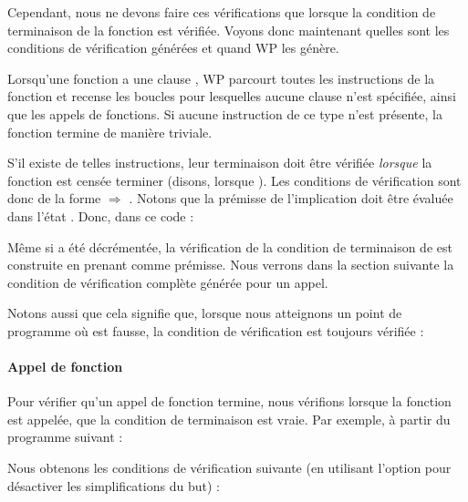 Cependant, nous ne devons faire ces vérifications que lorsque la condition de
terminaison de la fonction est vérifiée. Voyons donc maintenant quelles sont les
conditions de vérification générées et quand WP les génère.


Lorsqu'une fonction a une clause , WP parcourt toutes les
instructions de la fonction et recense les boucles pour lesquelles aucune
clause  n'est spécifiée, ainsi que les appels de
fonctions. Si aucune instruction de ce type n'est présente, la fonction termine
de manière triviale.




S'il existe de telles instructions, leur terminaison doit être vérifiée
\textit{lorsque} la fonction est censée terminer (disons, lorsque ).
Les conditions de vérification sont donc de la forme
 $\Rightarrow$ .
Notons que la prémisse de l'implication doit être évaluée dans l'état
. Donc, dans ce code :




Même si  a été décrémentée, la vérification de la condition de
terminaison de  est construite en prenant
 comme prémisse. Nous verrons dans
la section suivante la condition de vérification complète générée pour un appel.


Notons aussi que cela signifie que, lorsque nous atteignons un point de programme
où  est fausse, la condition de vérification est toujours
vérifiée :




\paragraph{Appel de fonction}


Pour vérifier qu'un appel de fonction termine, nous vérifions lorsque la
fonction est appelée, que la condition de terminaison est vraie. Par exemple, à
partir du programme suivant :




Nous obtenons les conditions de vérification suivante (en utilisant l'option
 pour désactiver les simplifications du but) :




